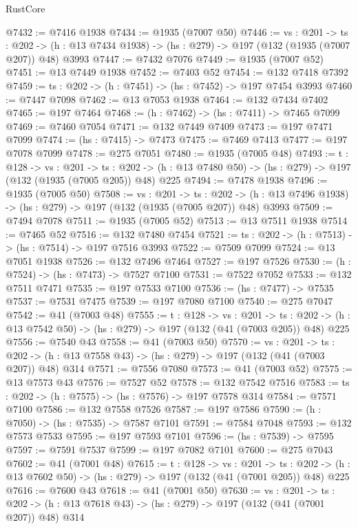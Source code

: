 \begin{lexlean}{RustCore}
\begin{coremodule}
@7432 := @7416 @1938
@7434 := @1935 (@7007 @50)
@7446 := {vs : @201} ->
  {ts : @202} -> (h : @13 @7434 @1938) -> (hs : @279) -> @197 (@132 (@1935 (@7007 @207)) @48) @3993
@7447 := @7432 @7076
@7449 := @1935 (@7007 @52)
@7451 := @13 @7449 @1938
@7452 := @7403 @52
@7454 := @132 @7418 @7392
@7459 := {ts : @202} -> (h : @7451) -> (hs : @7452) -> @197 @7454 @3993
@7460 := @7447 @7098
@7462 := @13 @7053 @1938
@7464 := @132 @7434 @7402
@7465 := @197 @7464
@7468 := (h : @7462) -> (hs : @7411) -> @7465 @7099
@7469 := @7460 @7054
@7471 := @132 @7449 @7409
@7473 := @197 @7471 @7099
@7474 := (hs : @7415) -> @7473
@7475 := @7469 @7413
@7477 := @197 @7078 @7099
@7478 := @275 @7051
@7480 := @1935 (@7005 @48)
@7493 := {t : @128} ->
  {vs : @201} ->
  {ts : @202} -> (h : @13 @7480 @50) -> (hs : @279) -> @197 (@132 (@1935 (@7005 @205)) @48) @225
@7494 := @7478 @1938
@7496 := @1935 (@7005 @50)
@7508 := {vs : @201} ->
  {ts : @202} -> (h : @13 @7496 @1938) -> (hs : @279) -> @197 (@132 (@1935 (@7005 @207)) @48) @3993
@7509 := @7494 @7078
@7511 := @1935 (@7005 @52)
@7513 := @13 @7511 @1938
@7514 := @7465 @52
@7516 := @132 @7480 @7454
@7521 := {ts : @202} -> (h : @7513) -> (hs : @7514) -> @197 @7516 @3993
@7522 := @7509 @7099
@7524 := @13 @7051 @1938
@7526 := @132 @7496 @7464
@7527 := @197 @7526
@7530 := (h : @7524) -> (hs : @7473) -> @7527 @7100
@7531 := @7522 @7052
@7533 := @132 @7511 @7471
@7535 := @197 @7533 @7100
@7536 := (hs : @7477) -> @7535
@7537 := @7531 @7475
@7539 := @197 @7080 @7100
@7540 := @275 @7047
@7542 := @41 (@7003 @48)
@7555 := {t : @128} ->
  {vs : @201} ->
  {ts : @202} -> (h : @13 @7542 @50) -> (hs : @279) -> @197 (@132 (@41 (@7003 @205)) @48) @225
@7556 := @7540 @43
@7558 := @41 (@7003 @50)
@7570 := {vs : @201} ->
  {ts : @202} -> (h : @13 @7558 @43) -> (hs : @279) -> @197 (@132 (@41 (@7003 @207)) @48) @314
@7571 := @7556 @7080
@7573 := @41 (@7003 @52)
@7575 := @13 @7573 @43
@7576 := @7527 @52
@7578 := @132 @7542 @7516
@7583 := {ts : @202} -> (h : @7575) -> (hs : @7576) -> @197 @7578 @314
@7584 := @7571 @7100
@7586 := @132 @7558 @7526
@7587 := @197 @7586
@7590 := (h : @7050) -> (hs : @7535) -> @7587 @7101
@7591 := @7584 @7048
@7593 := @132 @7573 @7533
@7595 := @197 @7593 @7101
@7596 := (hs : @7539) -> @7595
@7597 := @7591 @7537
@7599 := @197 @7082 @7101
@7600 := @275 @7043
@7602 := @41 (@7001 @48)
@7615 := {t : @128} ->
  {vs : @201} ->
  {ts : @202} -> (h : @13 @7602 @50) -> (hs : @279) -> @197 (@132 (@41 (@7001 @205)) @48) @225
@7616 := @7600 @43
@7618 := @41 (@7001 @50)
@7630 := {vs : @201} ->
  {ts : @202} -> (h : @13 @7618 @43) -> (hs : @279) -> @197 (@132 (@41 (@7001 @207)) @48) @314

\end{coremodule}
\end{lexlean}
